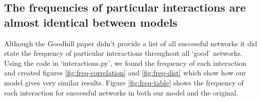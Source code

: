 \documentclass[a4paper,11pt]{article}
\begin{document}
\subsection{The frequencies of particular interactions are almost identical between models}
Although the Goodhill paper didn't provide a list of all successful networks it did state the frequency of particular interactions throughout all `good' networks. Using the code in `interactions.py', we found the frequency of each interaction and created figures \ref{fig:freq-correlation} and \ref{fig:freq-dist} which show how our model gives very similar results. Figure \ref{fig:freq-table} shows the frequency of each interaction for successful networks in both our model and the original.\par


\end{document}
